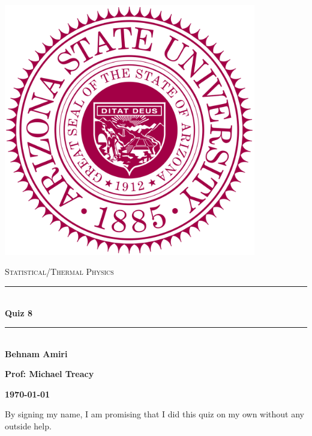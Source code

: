 \documentclass[fleqn]{article}
\begin{document}
  \begin{titlepage}

    \newcommand{\HRule}{\rule{\linewidth}{0.5mm}}

    \center

    \begin{center}
      \includegraphics[height=11cm, width=11cm]{asu.png}
    \end{center}

    \vline

    \textsc{\LARGE Statistical/Thermal Physics}\\[1.5cm]

    \HRule \\[0.5cm]
    { \huge \bfseries Quiz 8}\\[0.4cm] 
    \HRule \\[1.0cm]

    \textbf{Behnam Amiri}

    \bigbreak

    \textbf{Prof: Michael Treacy}

    \bigbreak

    \textbf{{\large \today}\\[2cm]}

    \vfill

  \end{titlepage}

  By signing my name, I am promising that I did this quiz on my own without any outside help.

  \vspace{0.5cm}
\end{document}
